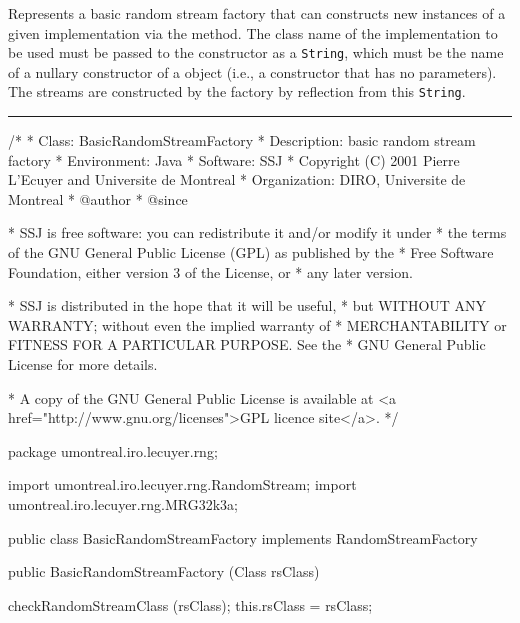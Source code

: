 
Represents a basic random stream factory that can constructs new
instances of a given  implementation via the
 method.
The class name of the implementation to be used must be passed to
the constructor as a \texttt{String}, which must be the name of
a nullary constructor of a  object
(i.e., a constructor that has no parameters).
The streams are constructed by the factory by reflection from this
\texttt{String}. 


\bigskip\hrule

\begin{code}
\begin{hide}
/*
 * Class:        BasicRandomStreamFactory
 * Description:  basic random stream factory
 * Environment:  Java
 * Software:     SSJ 
 * Copyright (C) 2001  Pierre L'Ecuyer and Universite de Montreal
 * Organization: DIRO, Universite de Montreal
 * @author       
 * @since

 * SSJ is free software: you can redistribute it and/or modify it under
 * the terms of the GNU General Public License (GPL) as published by the
 * Free Software Foundation, either version 3 of the License, or
 * any later version.

 * SSJ is distributed in the hope that it will be useful,
 * but WITHOUT ANY WARRANTY; without even the implied warranty of
 * MERCHANTABILITY or FITNESS FOR A PARTICULAR PURPOSE.  See the
 * GNU General Public License for more details.

 * A copy of the GNU General Public License is available at
   <a href="http://www.gnu.org/licenses">GPL licence site</a>.
 */
\end{hide}
package umontreal.iro.lecuyer.rng;\begin{hide}

import umontreal.iro.lecuyer.rng.RandomStream;
import umontreal.iro.lecuyer.rng.MRG32k3a;
\end{hide}

public class BasicRandomStreamFactory implements RandomStreamFactory\begin{hide} {
   private Class rsClass;
\end{hide}

   public BasicRandomStreamFactory (Class rsClass)\begin{hide} {
      checkRandomStreamClass (rsClass);
      this.rsClass = rsClass;
   }\end{hide}
\end{code}
